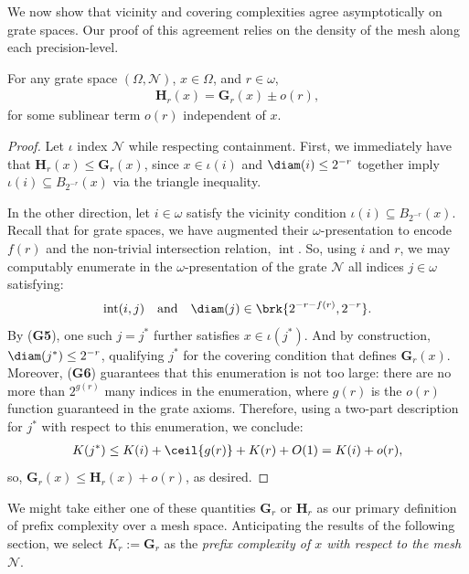 We now show that vicinity and covering complexities agree asymptotically on grate spaces. Our proof of this agreement relies on the density of the mesh along each precision-level. 

\begin{proposition}
    For any grate space $(\Omega, \mathcal{N})$, $x \in \Omega$, and $r \in \omega$,
    \begin{align*}
        \mathbf{H}_r(x) = \mathbf{G}_r(x) \pm o(r),
    \end{align*}
    for some sublinear term $o(r)$ independent of $x$.
    \label{prop:H_and_G_grate}
\end{proposition}
\begin{proof}
    Let $\iota$ index $\mathcal{N}$ while respecting containment. First, we immediately have that $\mathbf{H}_r(x) \leq \mathbf{G}_r(x)$, since $x \in \iota(i)$ and $\diam(i) \leq 2^{-r}$ together imply $\iota(i) \subseteq B_{2^{-r}}(x)$ via the triangle inequality.

    In the other direction, let $i \in \omega$ satisfy the vicinity condition $\iota(i) \subseteq B_{2^{-r}}(x)$. Recall that for grate spaces, we have augmented their $\omega$-presentation to encode $f(r)$ and the non-trivial intersection relation, $\operatorname{int}$. So, using $i$ and $r$, we may computably enumerate in the $\omega$-presentation of the grate $\mathcal{N}$ all indices $j \in \omega$ satisfying:
    \begin{align*}
        \operatorname{int}(i, j) \quad \text{and} \quad \diam(j) \in \brk{2^{-r -f(r)}, 2^{-r}}.
    \end{align*}
    By (\textbf{G5}), one such $j = j^*$ further satisfies $x \in \iota(j^*)$. And by construction, $\diam(j^*) \leq 2^{-r}$, qualifying $j^*$ for the covering condition that defines $\mathbf{G}_r(x)$. Moreover, (\textbf{G6}) guarantees that this enumeration is not too large: there are no more than $2^{g(r)}$ many indices in the enumeration, where $g(r)$ is the $o(r)$ function guaranteed in the grate axioms. Therefore, using a two-part description for $j^*$ with respect to this enumeration, we conclude:
    \begin{align*}
        K(j^*) \leq K(i) + \ceil{g(r)} + K(r) + O(1) = K(i) + o(r),
    \end{align*}
    so, $\mathbf{G}_r(x) \leq \mathbf{H}_r(x) + o(r)$, as desired.
 \end{proof}

We might take either one of these quantities $\mathbf{G}_r$ or $\mathbf{H}_r$ as our primary definition of prefix complexity over a mesh space. Anticipating the results of the following section, we select $K_r := \mathbf{G}_r$ as the \textit{prefix complexity of $x$ with respect to the mesh $\mathcal{N}$}. 

